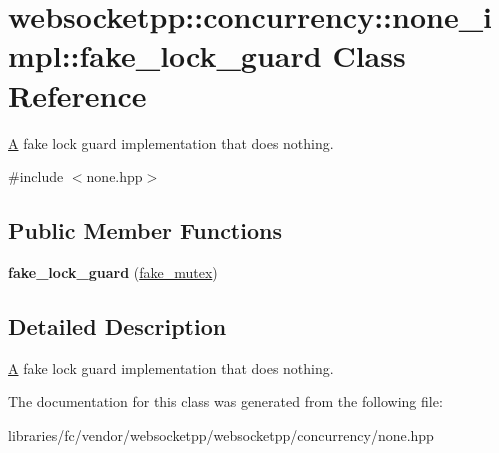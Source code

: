 \hypertarget{classwebsocketpp_1_1concurrency_1_1none__impl_1_1fake__lock__guard}{}\section{websocketpp\+:\+:concurrency\+:\+:none\+\_\+impl\+:\+:fake\+\_\+lock\+\_\+guard Class Reference}
\label{classwebsocketpp_1_1concurrency_1_1none__impl_1_1fake__lock__guard}


\mbox{\hyperlink{struct_a}{A}} fake lock guard implementation that does nothing.  




{\ttfamily \#include $<$none.\+hpp$>$}

\subsection*{Public Member Functions}
\begin{DoxyCompactItemize}
\item 
\mbox{\label{classwebsocketpp_1_1concurrency_1_1none__impl_1_1fake__lock__guard_a6b1764d95374ca8e341e187427088150}} 
{\bfseries fake\+\_\+lock\+\_\+guard} (\mbox{\hyperlink{classwebsocketpp_1_1concurrency_1_1none__impl_1_1fake__mutex}{fake\+\_\+mutex}})
\end{DoxyCompactItemize}


\subsection{Detailed Description}
\mbox{\hyperlink{struct_a}{A}} fake lock guard implementation that does nothing. 

The documentation for this class was generated from the following file\+:\begin{DoxyCompactItemize}
\item 
libraries/fc/vendor/websocketpp/websocketpp/concurrency/none.\+hpp\end{DoxyCompactItemize}

